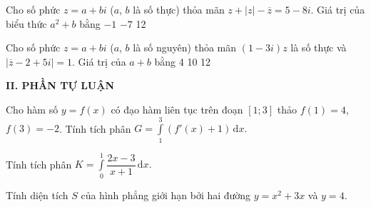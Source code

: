 \begin{ex}%
Cho số phức $z=a+bi$ ($a$, $b$ là số thực) thỏa mãn $z+|z|-\overline{z}=5-8i$. Giá trị của biểu thức $a^2+b$ bằng
\choice
{$-1$}
{}
{$-7$}
{12}
\end{ex}
\begin{ex}%
Cho số phức $z=a+bi$ ($a$, $b$ là số nguyên) thỏa mãn $(1-3i)z$ là số thực và $\left|\overline{z}-2+5i\right|=1$. Giá trị của $a+b$ bằng
\choice
{4}
{10}
{12}
{}
\end{ex}
\noindent\textbf{II. PHẦN TỰ LUẬN}
\begin{bt}%
Cho hàm số $y=f(x)$ có đạo hàm liên tục trên đoạn $[1;3]$ thảo $f(1)=4$, $f(3)=-2$. Tính tích phân $G=\displaystyle\int\limits_1^3 \left(f'(x)+1\right) \mathrm{\,d}x.$
\end{bt}

\begin{bt}%
Tính tích phân $K=\displaystyle\int\limits_0^1 \dfrac{2x-3}{x+1}\mathrm{\,d}x.$
\end{bt}
	
	
\begin{bt}%
Tính diện tích $S$ của hình phẳng giới hạn bởi hai đường $y=x^2+3x$ và $y=4.$
\end{bt}


